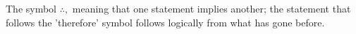 The symbol $ \therefore , $ meaning that one statement implies another;
the statement that follows the 'therefore' symbol follows logically from what
has gone before.
